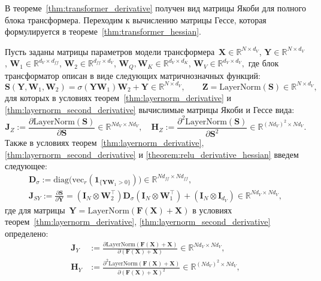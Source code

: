 В теореме~\ref{thm:transformer_derivative} получен вид матрицы Якоби для полного блока трансформера. Переходим к вычислению матрицы Гессе, которая формулируется в теореме~\ref{thm:transformer_hessian}.

\begin{theorem}\label{thm:transformer_hessian}
Пусть заданы матрицы параметров модели трансформера~$\mathbf{X} \in \mathbb{R}^{N \times d_V}$, $\mathbf{Y} \in \mathbb{R}^{N \times d_V}$, $\mathbf{W}_1 \in \mathbb{R}^{d_V \times d_{ff}}$, $\mathbf{W}_2 \in \mathbb{R}^{d_{ff} \times d_V}$, $\mathbf{W}_Q, \mathbf{W}_K \in \mathbb{R}^{d_V \times d_K}$, $\mathbf{W}_V \in \mathbb{R}^{d_V \times d_V},$
где блок трансформатор описан в виде следующих матричнозначных функций:
\[
    \mathbf{S}(\mathbf{Y},\mathbf{W}_1,\mathbf{W}_2) = \sigma(\mathbf{Y}\mathbf{W}_1)\mathbf{W}_2 + \mathbf{Y} \in \mathbb{R}^{N \times d_V}, \qquad\mathbf{Z} = \mathrm{LayerNorm}(\mathbf{S}) \in \mathbb{R}^{N \times d_V},
\]
для которых в условиях теорем~\ref{thm:layernorm_derivative} и \ref{thm:layernorm_second_derivative} вычислимые матрицы Якоби и Гессе вида:
\[
    \mathbf{J}_Z := \frac{\partial\mathrm{LayerNorm}(\mathbf{S})}{\partial \mathbf{S}} \in \mathbb{R}^{N d_V \times N d_V}, \quad\mathbf{H}_Z := \frac{\partial^2\mathrm{LayerNorm}(\mathbf{S})}{\partial \mathbf{S}^2} \in \mathbb{R}^{(N d_V)^2 \times N d_V}.
\]
Также в условиях теорем~\ref{thm:layernorm_derivative}, \ref{thm:layernorm_second_derivative} и \ref{theorem:relu_derivative_hessian} введем следующее:
\begin{align}
    \mathbf{D}_\sigma := \mathrm{diag}\big(\mathrm{vec}_r(\mathbf{1}_{\{\mathbf{Y}\mathbf{W}_1>0\}})\big) \in \mathbb{R}^{N d_{ff} \times N d_{ff}},\\
    \mathbf{J}_{SY} := \frac{\partial \mathbf{S}}{\partial \mathbf{Y}} = (\mathbf{I}_{N} \otimes \mathbf{W}_2^\top)\mathbf{D}_\sigma (\mathbf{I}_{N} \otimes \mathbf{W}_1^\top) + (\mathbf{I}_{N} \otimes \mathbf{I}_{d_V}) \in \mathbb{R}^{N d_V \times N d_V},
\end{align}
где для матрицы~$\mathbf{Y} = \mathrm{LayerNorm}(\mathbf{F}(\mathbf{X}) + \mathbf{X})$ в условиях теорем~\ref{thm:layernorm_derivative}, \ref{thm:layernorm_second_derivative} определено:
\begin{align}
    \mathbf{J}_Y &:= \frac{\partial \mathrm{LayerNorm}(\mathbf{F}(\mathbf{X})+\mathbf{X})}{\partial (\mathbf{F}(\mathbf{X})+\mathbf{X})} \in \mathbb{R}^{N d_V \times N d_V}, \\
    \mathbf{H}_Y &:= \frac{\partial^2 \mathrm{LayerNorm}(\mathbf{F}(\mathbf{X})+\mathbf{X})}{\partial (\mathbf{F}(\mathbf{X})+\mathbf{X})^2} \in \mathbb{R}^{(N d_V)^2 \times N d_V},

\end{align}
\end{theorem}
